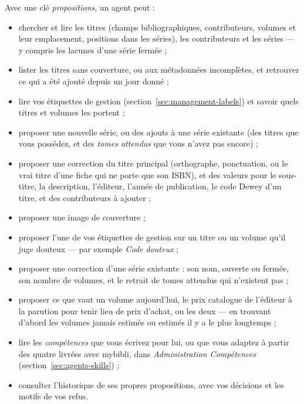 Avec une clé \emph{propositions}, un agent peut :

\begin{itemize}
  \item chercher et lire les titres (champs bibliographiques,
        contributeurs, volumes et leur emplacement, positions dans
        les séries), les contributeurs et les séries --- y compris
        les lacunes d'une série fermée ;
  \item lister les titres sans couverture, ou aux métadonnées
        incomplètes, et retrouver ce qui a été ajouté depuis un jour
        donné ;
  \item lire vos étiquettes de gestion
        (section~\ref{sec:management-labels}) et savoir quels titres et
        volumes les portent ;
  \item proposer une nouvelle série, ou des ajouts à une série
        existante (des titres que vous possédez, et des \emph{tomes
        attendus} que vous n'avez pas encore) ;
  \item proposer une correction du titre principal (orthographe,
        ponctuation, ou le vrai titre d'une fiche qui ne porte que son
        ISBN), et des valeurs pour le sous-titre, la description,
        l'éditeur, l'année de publication, le code Dewey d'un titre,
        et des contributeurs à ajouter ;
  \item proposer une image de couverture ;
  \item proposer l'une de vos étiquettes de gestion sur un titre ou un
        volume qu'il juge douteux --- par exemple \emph{Code douteux} ;
  \item proposer une correction d'une série existante : son nom, ouverte
        ou fermée, son nombre de volumes, et le retrait de tomes
        attendus qui n'existent pas ;
  \item proposer ce que vaut un volume aujourd'hui, le prix catalogue
        de l'éditeur à la parution pour tenir lieu de prix d'achat, ou
        les deux --- en trouvant d'abord les volumes jamais estimés ou
        estimés il y a le plus longtemps ;
  \item lire les \emph{compétences} que vous écrivez pour lui, ou que
        vous adaptez à partir des quatre livrées avec mybibli, dans
        \emph{Administration \textrightarrow{} Compétences}
        (section~\ref{sec:agents-skills}) ;
  \item consulter l'historique de ses propres propositions, avec vos
        décisions et les motifs de vos refus.
\end{itemize}

